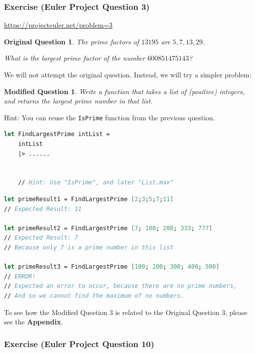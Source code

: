 \documentclass[12pt]{article}
\newtheorem*{modQuestion*}{Modified Question}
\newtheorem*{origQuestion*}{Original Question}
\begin{document}
\pagebreak

\subsubsection*{Exercise (Euler Project Question 3)}

\url{https://projecteuler.net/problem=3}

\begin{origQuestion*}
The prime factors of $13195$ are $5, 7, 13, 29$. 

What is the largest prime factor of the number $600851475143$?
\end{origQuestion*}

We will not attempt the original question. Instead, we will try a simpler problem:

\begin{modQuestion*}
Write a function that takes a list of (positive) integers, and returns the largest prime number in that list.
\end{modQuestion*}
Hint: You can reuse the \texttt{IsPrime} function from the previous question.

\begin{lstlisting}[language=FSharp]
let FindLargestPrime intList =
    intList
    |> ......


    // Hint: Use "IsPrime", and later "List.max"
\end{lstlisting}

\begin{lstlisting}[language=FSharp]
let primeResult1 = FindLargestPrime [2;3;5;7;11]
// Expected Result: 11

let primeResult2 = FindLargestPrime [7; 100; 200; 333; 777]
// Expected Result: 7
// Because only 7 is a prime number in this list

let primeResult3 = FindLargestPrime [100; 200; 300; 400; 500]
// ERROR!
// Expected an error to occur, because there are no prime numbers,
// And so we cannot find the maximum of no numbers.
\end{lstlisting}

To see how the Modified Question 3 is related to the Original Question 3, please see the \textbf{Appendix}.

\pagebreak

\subsubsection*{Exercise (Euler Project Question 10)}
\end{document}
